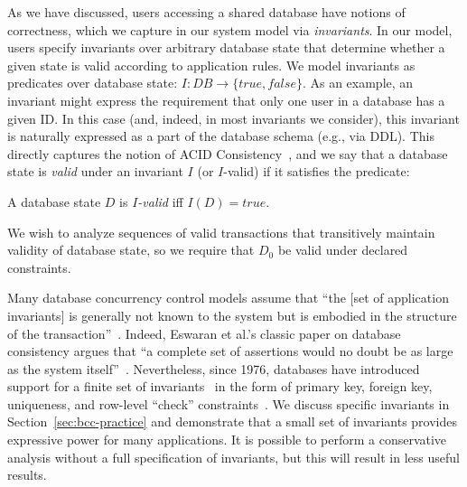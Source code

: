  As we have discussed, users accessing a shared
database have notions of correctness, which we capture in our system
model via \textit{invariants}. In our model, users specify invariants
over arbitrary database state that determine whether a given state is
valid according to application rules. We model invariants as
predicates over database state: $I: DB \rightarrow \{true, false\}$.  As
an example, an invariant might express the requirement that only one
user in a database has a given ID. In this case (and, indeed, in most
invariants we consider), this invariant is naturally expressed as a
part of the database schema (e.g., via DDL). This directly captures
the notion of ACID Consistency~\cite{bernstein-book,gray-virtues}, and
we say that a database state is \textit{valid} under an invariant $I$
(or $I$-valid) if it satisfies the predicate:

\begin{definition}
A database state $D$ is \textit{$I$-valid} iff $I(D) = true$.
\end{definition}

We wish to analyze sequences of valid transactions that transitively
maintain validity of database state, so we require that $D_0$ be valid
under declared constraints.

 Many database concurrency
control models assume that ``the [set of application invariants] is
generally not known to the system but is embodied in the structure of
the transaction''~\cite{traiger-tods}. Indeed, Eswaran et al.'s
classic paper on database consistency argues that ``a complete set of
assertions would no doubt be as large as the system
itself''~\cite{eswaran-consistency}. Nevertheless, since 1976,
databases have introduced support for a finite set of
invariants~\cite{korth-serializability,decomp-semantics,garciamolina-semantics,ic-survey,ic-survey-two}
in the form of primary key, foreign key, uniqueness, and row-level
``check'' constraints~\cite{kemme-si-ic}. We discuss specific
invariants in Section~\ref{sec:bcc-practice} and demonstrate that a
small set of invariants provides expressive power for many
applications. It is possible to perform a conservative analysis
without a full specification of invariants, but this will result in
less useful results.\vspace{.5em}


